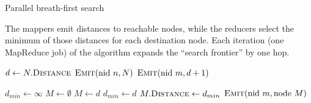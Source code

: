 \begin{algorithm}[t]
\caption{Parallel breath-first search}
\label{algorithm:chapter-graphs:BFS}
The mappers emit distances to reachable nodes, while the reducers
select the minimum of those distances for each destination node.  Each
iteration (one MapReduce job) of the algorithm expands the ``search
frontier'' by one hop.

\algrenewcommand{}
\algrenewcommand{}
  \begin{algorithmic}[1]
    \State $d \gets N.\textsc{Distance}$
    \State $\textsc{Emit}(\textrm{nid }n, N)$
      \State $\textsc{Emit}(\textrm{nid }m, d+1)$
    \EndFor
    \EndProcedure
    \EndFunction
  \end{algorithmic}

  \begin{algorithmic}[1]
    \State $d_{min} \gets \infty$
    \State $M \gets \emptyset$
        \State $M \gets d$
        \State $d_{min} \gets d$
      \EndIf
    \EndFor
    \State $M.\textsc{Distance} \gets d_{min}$
    \State $\textsc{Emit}(\textrm{nid }m, \textrm{node }M)$
    \EndProcedure
    \EndFunction
  \end{algorithmic}
\end{algorithm}

